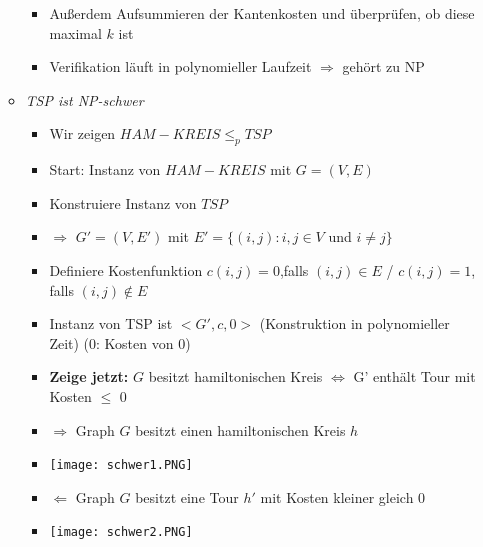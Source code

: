\begin{itemize}
\begin{itemize}
\begin{itemize}
                            \item Außerdem Aufsummieren der Kantenkosten und überprüfen, ob diese maximal $k$ ist
                            \item Verifikation läuft in polynomieller Laufzeit $\Rightarrow$ gehört zu NP
                        \end{itemize}
                    \item \textit{TSP ist NP-schwer}
                        \begin{itemize}
                            \item Wir zeigen $HAM-KREIS \leq_p TSP$
                            \item Start: Instanz von $HAM-KREIS$ mit $G=(V,E)$
                            \item Konstruiere Instanz von $TSP$
                            \item[] $\Rightarrow$ $G'=(V,E')$ mit $E'=\{(i,j):i,j \in V$ und $i\neq j\}$
                            \item Definiere Kostenfunktion $c(i,j) = 0$,falls $(i,j) \in E$ / $c(i,j)=1$, falls $(i,j) \notin E$
                            \item Instanz von TSP ist $<G', c, 0>$ (Konstruktion in polynomieller Zeit) (0: Kosten von 0)
                            \item \textbf{Zeige jetzt:} $G$ besitzt hamiltonischen Kreis $\Leftrightarrow$ G' enthält Tour mit Kosten $\leq$ 0
                            \item $\Rightarrow$ Graph $G$ besitzt einen hamiltonischen Kreis $h$
                            \item[] \texttt{[image: schwer1.PNG]}
                            \item $\Leftarrow$ Graph $G$ besitzt eine Tour $h'$ mit Kosten kleiner gleich 0
                            \item[] \texttt{[image: schwer2.PNG]}
                        \end{itemize}
                \end{itemize}

    \end{itemize}
